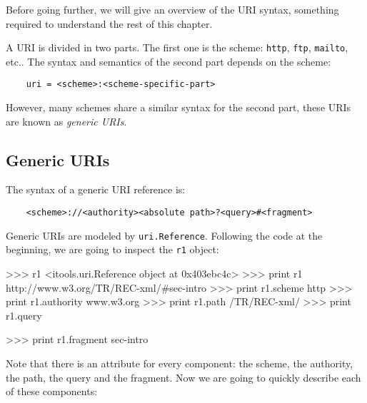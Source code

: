 Before going further, we will give an overview of the URI syntax, something
required to understand the rest of this chapter.

A URI is divided in two parts. The first one is the scheme: {\tt http},
{\tt ftp}, {\tt mailto}, etc.. The syntax and semantics of the second
part depends on the scheme:

\begin{verbatim}
    uri = <scheme>:<scheme-specific-part>
\end{verbatim}

However, many schemes share a similar syntax for the second part, these
URIs are known as {\em generic URIs}.

\subsection{Generic URIs}

The syntax of a generic URI reference is:

\begin{verbatim}
    <scheme>://<authority><absolute path>?<query>#<fragment>
\end{verbatim}

Generic URIs are modeled by {\tt uri.Reference}. Following the code at the
beginning, we are going to inspect the {\tt r1} object:

\begin{code}
    >>> r1
    <itools.uri.Reference object at 0x403ebc4c>
    >>> print r1
    http://www.w3.org/TR/REC-xml/#sec-intro
    >>> print r1.scheme
    http
    >>> print r1.authority
    www.w3.org
    >>> print r1.path     
    /TR/REC-xml/
    >>> print r1.query

    >>> print r1.fragment
    sec-intro
\end{code}

Note that there is an attribute for every component: the scheme, the
authority, the path, the query and the fragment. Now we are going to
quickly describe each of these components:

